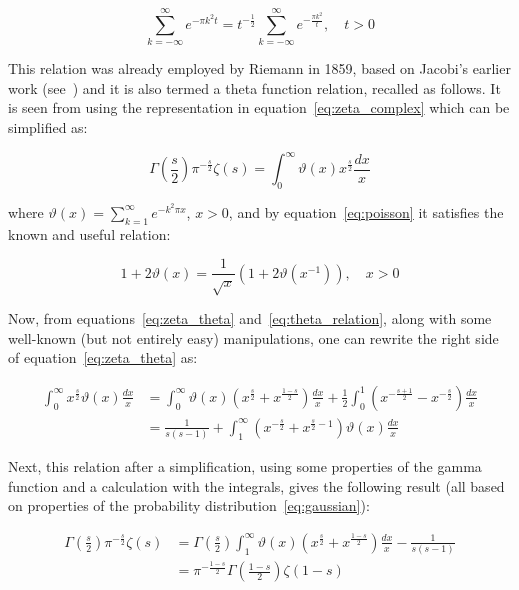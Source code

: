 \documentclass[11pt]{article}
\begin{document}
\begin{equation}
\label{eq:poisson}
\sum_{k=-\infty}^\infty e^{-\pi k^2 t} = t^{-\frac{1}{2}} \sum_{k=-\infty}^\infty e^{-\frac{\pi k^2}{t}}, \quad t > 0
\end{equation}

This relation was already employed by Riemann in 1859, based on Jacobi's earlier work (see~\cite{edwards}) and it is also termed a theta function relation, recalled as follows. It is seen from using the representation in equation~\eqref{eq:zeta_complex} which can be simplified as:

\begin{equation}
\label{eq:zeta_theta}
\Gamma\left(\frac{s}{2}\right) \pi^{-\frac{s}{2}} \zeta(s) = \int_0^\infty \vartheta(x) x^{\frac{s}{2}} \frac{dx}{x}
\end{equation}

where $\vartheta(x) = \sum_{k=1}^\infty e^{-k^2 \pi x}$, $x > 0$, and by equation~\eqref{eq:poisson} it satisfies the known and useful relation:

\begin{equation}
\label{eq:theta_relation}
1 + 2\vartheta(x) = \frac{1}{\sqrt{x}}(1 + 2\vartheta(x^{-1})), \quad x > 0
\end{equation}

Now, from equations~\eqref{eq:zeta_theta} and~\eqref{eq:theta_relation}, along with some well-known (but not entirely easy) manipulations, one can rewrite the right side of equation~\eqref{eq:zeta_theta} as:

\begin{align}
\label{eq:zeta_manipulation}
\int_0^\infty x^{\frac{s}{2}} \vartheta(x) \frac{dx}{x} &= \int_0^\infty \vartheta(x) \left( x^{\frac{s}{2}} + x^{\frac{1-s}{2}} \right) \frac{dx}{x} + \frac{1}{2} \int_0^1 \left( x^{-\frac{s+1}{2}} - x^{-\frac{s}{2}} \right) \frac{dx}{x} \\
&= \frac{1}{s(s-1)} + \int_1^\infty \left( x^{-\frac{s}{2}} + x^{\frac{s}{2}-1} \right) \vartheta(x) \frac{dx}{x} \nonumber
\end{align}

Next, this relation after a simplification, using some properties of the gamma function and a calculation with the integrals, gives the following result (all based on properties of the probability distribution~\eqref{eq:gaussian}):

\begin{align}
\label{eq:functional_derivation}
\Gamma\left(\frac{s}{2}\right) \pi^{-\frac{s}{2}} \zeta(s) &= \Gamma\left(\frac{s}{2}\right) \int_1^\infty \vartheta(x) \left( x^{\frac{s}{2}} + x^{\frac{1-s}{2}} \right) \frac{dx}{x} - \frac{1}{s(s-1)} \\
&= \pi^{-\frac{1-s}{2}} \Gamma\left(\frac{1-s}{2}\right) \zeta(1-s) \nonumber
\end{align}
\end{document}
